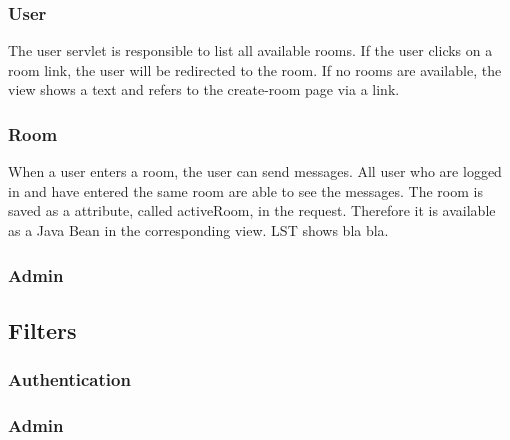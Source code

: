 \subsubsection{User}\label{subsubsec:03_impl_servlets_user}
The user servlet is responsible to list all available rooms. If the user clicks on a room link, the user will be redirected to the room.
If no rooms are available, the view shows a text and refers to the create-room page via a link. 

\subsubsection{Room}\label{subsubsec:03_impl_servlets_room}
When a user enters a room, the user can send messages. All user who are logged in and have entered the same room are able to see the messages. The room is saved as a attribute, called activeRoom, in the request. Therefore it is available as a Java Bean in the corresponding view. LST shows bla bla.

\subsubsection{Admin}\label{subsubsec:03_impl_servlets_admin}


\subsection{Filters}\label{subsec:03_impl_filters}

\subsubsection{Authentication}\label{subsubsec:03_impl_filters_auth}

\subsubsection{Admin}\label{subsubsec:03_impl_filters_admin}
